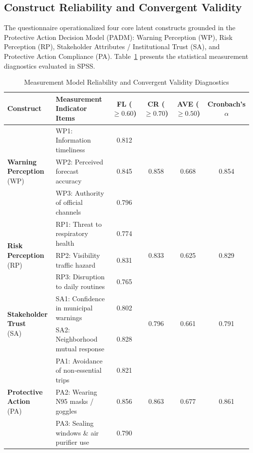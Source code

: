 \subsection{Construct Reliability and Convergent Validity}
\label{subsec:reliability_validity}

The questionnaire operationalized four core latent constructs grounded in the Protective Action Decision Model (PADM): Warning Perception (WP), Risk Perception (RP), Stakeholder Attributes / Institutional Trust (SA), and Protective Action Compliance (PA). Table~\ref{tab:sem_constructs} presents the statistical measurement diagnostics evaluated in SPSS.

\begin{table}[H]
\centering
\small
\caption{Measurement Model Reliability and Convergent Validity Diagnostics}
\label{tab:sem_constructs}
\begin{tabularx}{\textwidth}{l p{5.5cm} c c c c}
\toprule
\textbf{Construct} & \textbf{Measurement Indicator Items} & \textbf{FL ($\ge 0.60$)} & \textbf{CR ($\ge 0.70$)} & \textbf{AVE ($\ge 0.50$)} & \textbf{Cronbach's $\alpha$} \\
\midrule
\multirow{3}{*}{\parbox{2.5cm}{\textbf{Warning Perception}\\ (WP)}} 
& WP1: Information timeliness & 0.812 & \multirow{3}{*}{0.858} & \multirow{3}{*}{0.668} & \multirow{3}{*}{0.854} \\
& WP2: Perceived forecast accuracy & 0.845 & & & \\
& WP3: Authority of official channels & 0.796 & & & \\
\midrule
\multirow{3}{*}{\parbox{2.5cm}{\textbf{Risk Perception}\\ (RP)}} 
& RP1: Threat to respiratory health & 0.774 & \multirow{3}{*}{0.833} & \multirow{3}{*}{0.625} & \multirow{3}{*}{0.829} \\
& RP2: Visibility traffic hazard & 0.831 & & & \\
& RP3: Disruption to daily routines & 0.765 & & & \\
\midrule
\multirow{2}{*}{\parbox{2.5cm}{\textbf{Stakeholder Trust}\\ (SA)}} 
& SA1: Confidence in municipal warnings & 0.802 & \multirow{2}{*}{0.796} & \multirow{2}{*}{0.661} & \multirow{2}{*}{0.791} \\
& SA2: Neighborhood mutual response & 0.828 & & & \\
\midrule
\multirow{3}{*}{\parbox{2.5cm}{\textbf{Protective Action}\\ (PA)}} 
& PA1: Avoidance of non-essential trips & 0.821 & \multirow{3}{*}{0.863} & \multirow{3}{*}{0.677} & \multirow{3}{*}{0.861} \\
& PA2: Wearing N95 masks / goggles & 0.856 & & & \\
& PA3: Sealing windows \& air purifier use & 0.790 & & & \\
\bottomrule
\end{tabularx}
\end{table}

